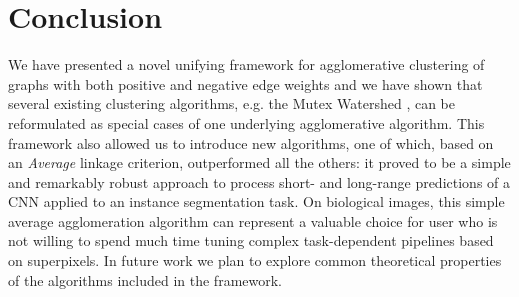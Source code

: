 \section{Conclusion}
We have presented a novel unifying framework for agglomerative clustering of graphs with both positive and negative edge weights and we have shown that several existing clustering algorithms, e.g. the Mutex Watershed \cite{wolf2018mutex}, can be reformulated as special cases of one underlying agglomerative algorithm. This framework also allowed us to introduce new algorithms, one of which, based on an \emph{Average} linkage criterion, outperformed all the others: it proved to be a simple and remarkably robust approach to process short- and long-range predictions of a CNN applied to an instance segmentation task.
On biological images, this simple average agglomeration algorithm can represent a valuable choice for user who is not willing to spend much time tuning complex task-dependent pipelines based on superpixels.  
In future work we plan to explore common theoretical properties of the algorithms included in the framework.
